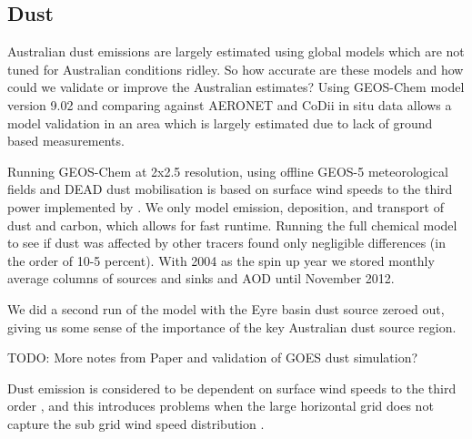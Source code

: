 \subsection{Dust}
Australian dust emissions are largely estimated using global models which are not tuned for Australian conditions ridley\cite{Ridley_2013,Duncan_Fairlie_2007}.
So how accurate are these models and how could we validate or improve the Australian estimates?
Using GEOS-Chem model version 9.02 and comparing against AERONET and CoDii in situ data allows a model validation in an area which is largely estimated due to lack of ground based measurements.

Running GEOS-Chem at 2x2.5 resolution, using offline GEOS-5 meteorological fields and DEAD dust mobilisation is based on surface wind speeds to the third power implemented by \citet{Duncan_Fairlie_2007}. We only model emission, deposition, and transport of dust and carbon, which allows for fast runtime. Running the full chemical model to see if dust was affected by other tracers found only negligible differences (in the order of 10-5 percent). With 2004 as the spin up year we stored monthly average columns of sources and sinks and AOD until November 2012.

We did a second run of the model with the Eyre basin dust source zeroed out, giving us some sense of the importance of the key Australian dust source region.

TODO: More notes from Paper and validation of GOES dust simulation?
  
Dust emission is considered to be dependent on surface wind speeds to the third order \cite{Duncan_Fairlie_2007}, and this introduces problems when the large horizontal grid does not capture the sub grid wind speed distribution \cite{Ridley_2013}.